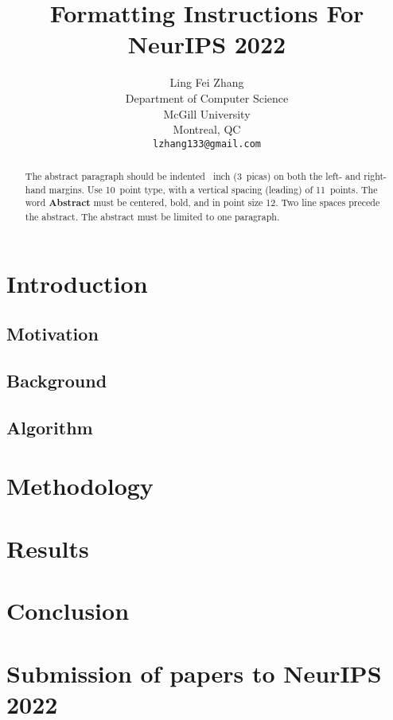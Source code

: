 \documentclass{article}
\title{Formatting Instructions For NeurIPS 2022}
\author{%
      Ling Fei Zhang\\
      Department of Computer Science\\ McGill University\\ Montreal, QC \\
      \texttt{lzhang133@gmail.com} \\
}
\begin{document}
\maketitle

\begin{abstract}
      The abstract paragraph should be indented ~inch (3~picas) on
      both the left- and right-hand margins. Use 10~point type, with a vertical
      spacing (leading) of 11~points.  The word \textbf{Abstract} must be centered,
      bold, and in point size 12. Two line spaces precede the abstract. The abstract
      must be limited to one paragraph.
\end{abstract}

\section{Introduction}

\subsection{Motivation}

\subsection{Background}

\subsection{Algorithm}

\section{Methodology}

\section{Results}

\section{Conclusion}

\newpage
\section{Submission of papers to NeurIPS 2022}
\end{document}
